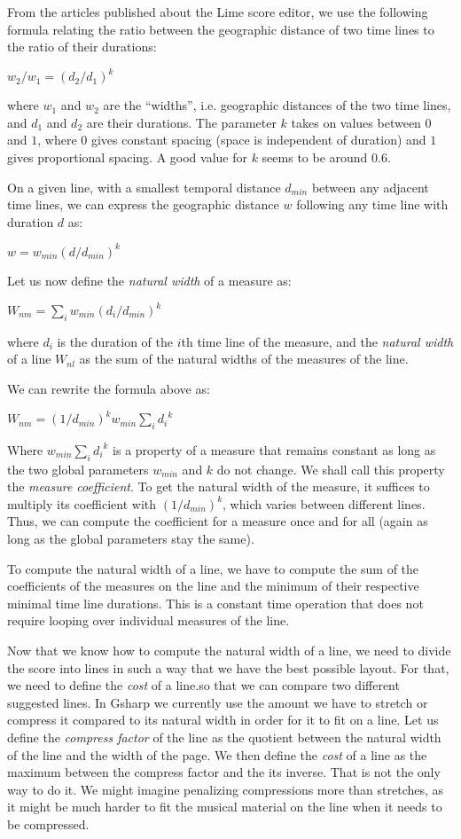 \documentclass[11pt]{book}
\def\gs{Gsharp}
\begin{document}
From the articles published about the Lime score editor, we use the
following formula relating the ratio between the geographic distance
of two time lines to the ratio of their durations:

$w_2 / w_1 = {(d_2 / d_1)}^k$

where $w_1$ and $w_2$ are the ``widths'', i.e. geographic distances of
the two time lines, and $d_1$ and $d_2$ are their durations. The
parameter $k$ takes on values between $0$ and $1$, where $0$ gives
constant spacing (space is independent of duration) and $1$ gives
proportional spacing.  A good value for $k$ seems to be around $0.6$. 

On a given line, with a smallest temporal distance $d_{min}$ between
any adjacent time lines, we can express the geographic distance
$w$ following any time line with duration $d$ as:

$w = w_{min} {(d / d_{min})}^k$

Let us now define the \emph{natural width} of a measure as:

$W_{nm} = \sum_i w_{min} {(d_i / d_{min})}^k$

where $d_i$ is the duration of the $i$th time line of the measure, and
the \emph{natural width} of a line $W_{nl}$ as the sum of the natural
widths of the measures of the line.  

We can rewrite the formula above as:

$W_{nm} = {(1 / d_{min})}^k w_{min}  \sum_i {d_i}^k$

Where $w_{min}  \sum_i {d_i}^k$ is a property of a measure that
remains constant as long as the two global parameters $w_{min}$ and
$k$ do not change.  We shall call this property the \emph{measure
coefficient}.  To get the natural width of the measure, it suffices to
multiply its coefficient with ${(1 / d_{min})}^k$, which varies
between different lines.  Thus, we can compute the coefficient for a
measure once and for all (again as long as the global parameters stay
the same). 

To compute the natural width of a line, we have to compute the sum of
the coefficients of the measures on the line and the minimum of their
respective minimal time line durations.  This is a constant time
operation that does not require looping over individual measures of
the line.  

Now that we know how to compute the natural width of a line, we need
to divide the score into lines in such a way that we have the best
possible layout.  For that, we need to define the \emph{cost} of a
line.so that we can compare two different suggested lines.  In {\gs}
we currently use the amount we have to stretch or compress it compared
to its natural width in order for it to fit on a line.  Let us define
the \emph{compress factor} of the line as the quotient between the
natural width of the line and the width of the page.  We then define
the \emph{cost} of a line as the maximum between the compress factor
and the its inverse.  That is not the only way to do it.  We might
imagine penalizing compressions more than stretches, as it might be
much harder to fit the musical material on the line when it needs to
be compressed. 
\end{document}
